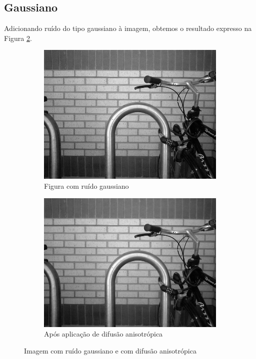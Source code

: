 \documentclass[10pt,a4paper]{article}
\begin{document}
\subsection{Gaussiano}
Adicionando ruído do tipo gaussiano à imagem, obtemos o resultado expresso na Figura \ref{fig:aniso_diff_ga}.
\begin{figure}[!ht]
    \centering
    \begin{subfigure}[ht]{0.4\textwidth}
        \includegraphics[width=\textwidth]{dst_ga.jpg}
        \caption{Figura com ruído gaussiano\cite{bike}}
        \label{fig:src_ga}
    \end{subfigure}
    \qquad
    \begin{subfigure}[ht]{0.4\textwidth}
        \includegraphics[width=\textwidth]{aniso_ga.jpg}
        \caption{\centering Após aplicação de difusão anisotrópica}
    \end{subfigure}
    \caption{Imagem com ruído gaussiano e com difusão anisotrópica}
    \label{fig:aniso_diff_ga}
\end{figure}
\end{document}
